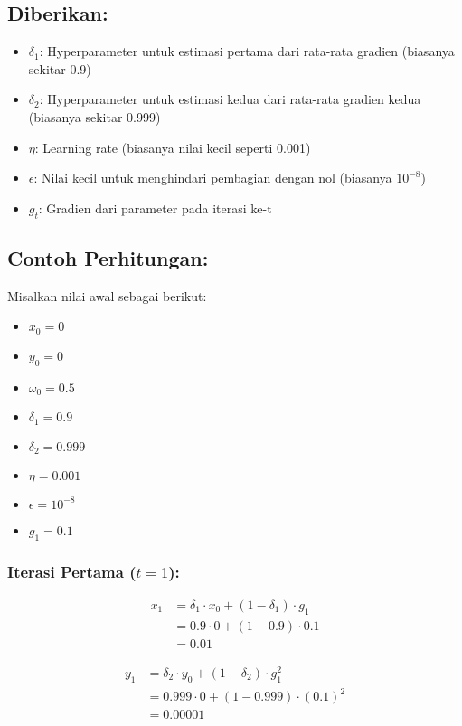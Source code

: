 \subsection*{Diberikan:}
\begin{itemize}
    \item $\delta_1$: Hyperparameter untuk estimasi pertama dari rata-rata gradien (biasanya sekitar 0.9)
    \item $\delta_2$: Hyperparameter untuk estimasi kedua dari rata-rata gradien kedua (biasanya sekitar 0.999)
    \item $\eta$: Learning rate (biasanya nilai kecil seperti 0.001)
    \item $\epsilon$: Nilai kecil untuk menghindari pembagian dengan nol (biasanya $10^{-8}$)
    \item $g_t$: Gradien dari parameter pada iterasi ke-t
\end{itemize}



\subsection*{Contoh Perhitungan:}
Misalkan nilai awal sebagai berikut:
\begin{itemize}
    \item $x_0 = 0$
    \item $y_0 = 0$
    \item $\omega_0 = 0.5$
    \item $\delta_1 = 0.9$
    \item $\delta_2 = 0.999$
    \item $\eta = 0.001$
    \item $\epsilon = 10^{-8}$
    \item $g_1 = 0.1$
\end{itemize}

\subsubsection*{Iterasi Pertama ($t=1$):}
\begin{align}
    x_1 &= \delta_1 \cdot x_0 + (1 - \delta_1) \cdot g_1 \nonumber \\
    &= 0.9 \cdot 0 + (1 - 0.9) \cdot 0.1 \nonumber \\
    &= 0.01
\end{align}

\begin{align}
    y_1 &= \delta_2 \cdot y_0 + (1 - \delta_2) \cdot g_1^2 \nonumber \\
    &= 0.999 \cdot 0 + (1 - 0.999) \cdot (0.1)^2 \nonumber \\
    &= 0.00001
\end{align}

